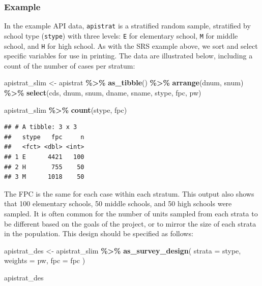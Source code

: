 \documentclass[
]{krantz}
\makeatletter
\newenvironment{Shaded}{\begin{snugshade}}{\end{snugshade}}
\newcommand{\AttributeTok}[1]{\textcolor[rgb]{0.27,0.27,0.27}{#1}}
\newcommand{\FunctionTok}[1]{\textcolor[rgb]{0.27,0.27,0.27}{\textbf{#1}}}
\newcommand{\NormalTok}[1]{#1}
\newcommand{\OtherTok}[1]{\textcolor[rgb]{0.37,0.37,0.37}{#1}}
\newcommand{\SpecialCharTok}[1]{\textcolor[rgb]{0.43,0.43,0.43}{\textbf{#1}}}
\newenvironment{kframe}{%
\medskip{}
\setlength{\fboxsep}{.8em}
 \def\at@end@of@kframe{}%
 \ifinner\ifhmode%
  \def\at@end@of@kframe{\end{minipage}}%
  \begin{minipage}{\columnwidth}%
 \fi\fi%
 \def\FrameCommand##1{\hskip\@totalleftmargin \hskip-\fboxsep
 \colorbox{shadecolor}{##1}\hskip-\fboxsep
     \hskip-\linewidth \hskip-\@totalleftmargin \hskip\columnwidth}%
 \MakeFramed {\advance\hsize-\width
   \@totalleftmargin\z@ \linewidth\hsize
   \@setminipage}}%
 {\par\unskip\endMakeFramed%
 \at@end@of@kframe}
\renewenvironment{Shaded}{\begin{kframe}}{\end{kframe}}
\makeatother
\begin{document}
\hypertarget{example-4}{%
\subsubsection*{Example}\label{example-4}}


In the example API data, \texttt{apistrat} is a stratified random sample, stratified by school type (\texttt{stype}) with three levels: \texttt{E} for elementary school, \texttt{M} for middle school, and \texttt{H} for high school. As with the SRS example above, we sort and select specific variables for use in printing. The data are illustrated below, including a count of the number of cases per stratum:

\begin{Shaded}
\begin{Highlighting}[]
\NormalTok{apistrat\_slim }\OtherTok{\textless{}{-}}
\NormalTok{  apistrat }\SpecialCharTok{\%\textgreater{}\%}
  \FunctionTok{as\_tibble}\NormalTok{() }\SpecialCharTok{\%\textgreater{}\%}
  \FunctionTok{arrange}\NormalTok{(dnum, snum) }\SpecialCharTok{\%\textgreater{}\%}
  \FunctionTok{select}\NormalTok{(cds, dnum, snum, dname, sname, stype, fpc, pw)}

\NormalTok{apistrat\_slim }\SpecialCharTok{\%\textgreater{}\%}
  \FunctionTok{count}\NormalTok{(stype, fpc)}
\end{Highlighting}
\end{Shaded}

\begin{verbatim}
## # A tibble: 3 x 3
##   stype   fpc     n
##   <fct> <dbl> <int>
## 1 E      4421   100
## 2 H       755    50
## 3 M      1018    50
\end{verbatim}

The FPC is the same for each case within each stratum. This output also shows that 100 elementary schools, 50 middle schools, and 50 high schools were sampled. It is often common for the number of units sampled from each strata to be different based on the goals of the project, or to mirror the size of each strata in the population. This design should be specified as follows:

\begin{Shaded}
\begin{Highlighting}[]
\NormalTok{apistrat\_des }\OtherTok{\textless{}{-}}\NormalTok{ apistrat\_slim }\SpecialCharTok{\%\textgreater{}\%}
  \FunctionTok{as\_survey\_design}\NormalTok{(}
    \AttributeTok{strata =}\NormalTok{ stype,}
    \AttributeTok{weights =}\NormalTok{ pw,}
    \AttributeTok{fpc =}\NormalTok{ fpc}
\NormalTok{  )}

\NormalTok{apistrat\_des}
\end{Highlighting}
\end{Shaded}
\end{document}
